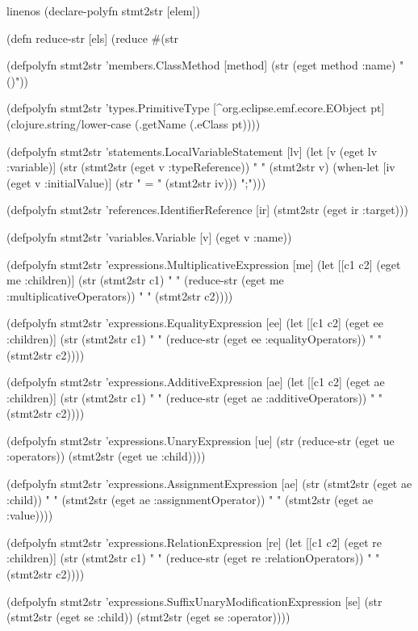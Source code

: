 \documentclass[submission]{eptcs}
\begin{document}
\begin{clojurecode*}{linenos}
(declare-polyfn stmt2str [elem])

(defn reduce-str [els]
  (reduce #(str %

(defpolyfn stmt2str 'members.ClassMethod [method]
  (str (eget method :name) "()"))

(defpolyfn stmt2str 'types.PrimitiveType [^org.eclipse.emf.ecore.EObject pt]
  (clojure.string/lower-case (.getName (.eClass pt))))

(defpolyfn stmt2str 'statements.LocalVariableStatement [lv]
  (let [v (eget lv :variable)]
    (str (stmt2str (eget v :typeReference)) " " (stmt2str v)
         (when-let [iv (eget v :initialValue)]
           (str " = " (stmt2str iv)))
         ";")))

(defpolyfn stmt2str 'references.IdentifierReference [ir]
  (stmt2str (eget ir :target)))

(defpolyfn stmt2str 'variables.Variable [v]
  (eget v :name))

(defpolyfn stmt2str 'expressions.MultiplicativeExpression [me]
  (let [[c1 c2] (eget me :children)]
    (str (stmt2str c1) " " (reduce-str (eget me :multiplicativeOperators))
         " " (stmt2str c2))))

(defpolyfn stmt2str 'expressions.EqualityExpression [ee]
  (let [[c1 c2] (eget ee :children)]
    (str (stmt2str c1) " " (reduce-str (eget ee :equalityOperators))
         " " (stmt2str c2))))

(defpolyfn stmt2str 'expressions.AdditiveExpression [ae]
  (let [[c1 c2] (eget ae :children)]
    (str (stmt2str c1) " " (reduce-str (eget ae :additiveOperators))
         " " (stmt2str c2))))

(defpolyfn stmt2str 'expressions.UnaryExpression [ue]
  (str (reduce-str (eget ue :operators))
       (stmt2str (eget ue :child))))

(defpolyfn stmt2str 'expressions.AssignmentExpression [ae]
  (str (stmt2str (eget ae :child)) " "
       (stmt2str (eget ae :assignmentOperator)) " "
       (stmt2str (eget ae :value))))

(defpolyfn stmt2str 'expressions.RelationExpression [re]
  (let [[c1 c2] (eget re :children)]
    (str (stmt2str c1) " "
         (reduce-str (eget re :relationOperators))
         " " (stmt2str c2))))

(defpolyfn stmt2str 'expressions.SuffixUnaryModificationExpression [se]
  (str (stmt2str (eget se :child))
       (stmt2str (eget se :operator))))


\end{clojurecode*}
\end{document}
